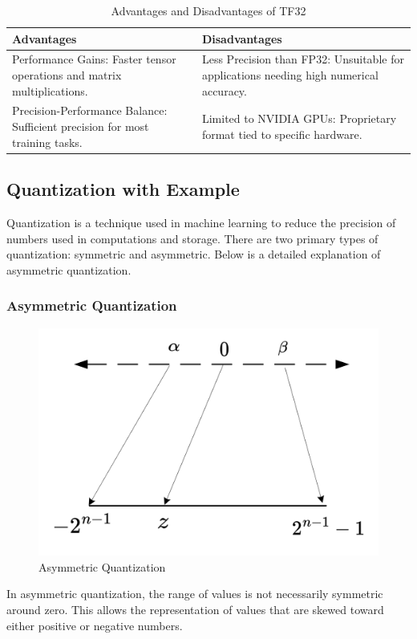 \begin{enumerate}[label=\textbf{\roman*.}]
    \begin{table}[H]
        \centering
        \caption{Advantages and Disadvantages of TF32}
        \label{tab:tf32}
        \begin{tabular}{|p{6cm}|p{6cm}|}
        \hline
        \textbf{Advantages} & \textbf{Disadvantages} \\
        \hline
        Performance Gains: Faster tensor operations and matrix multiplications. & Less Precision than FP32: Unsuitable for applications needing high numerical accuracy. \\
        \hline
        Precision-Performance Balance: Sufficient precision for most training tasks. & Limited to NVIDIA GPUs: Proprietary format tied to specific hardware. \\
        \hline
        \end{tabular}
        \end{table}
        
\end{enumerate}

\pagebreak


\setcounter{subsection}{5}
\subsection{Quantization with Example}
\label{app:quantization-manual-conversion}

Quantization is a technique used in machine learning to reduce the precision of numbers used in computations and storage. There are two primary types of quantization: symmetric and asymmetric. Below is a detailed explanation of asymmetric quantization.

\subsubsection{Asymmetric Quantization}
\begin{figure}[H]
    \centering
    \includegraphics[width=0.7\linewidth]{assets/quantization/Unsymmetric_Qfigure.png}
    \caption{Asymmetric Quantization}
    \label{fig:Unsymmetric_Qfigure}
\end{figure}
In asymmetric quantization, the range of values is not necessarily symmetric around zero. This allows the representation of values that are skewed toward either positive or negative numbers.

